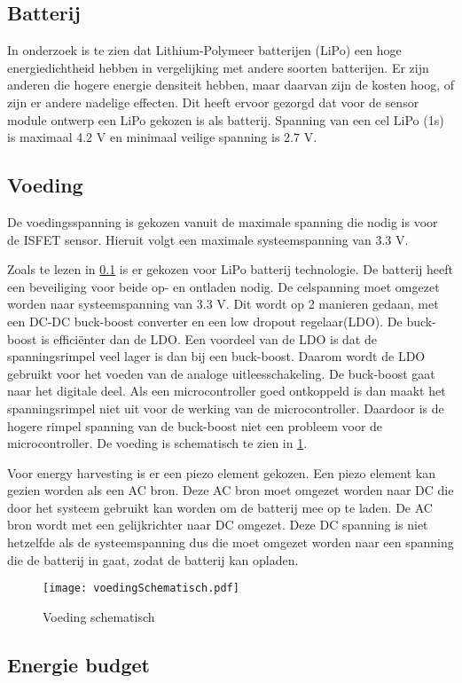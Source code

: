 \subsection{Batterij} \label{sec:battery}
In onderzoek \cite{BatteryComparison} is te zien dat Lithium-Polymeer batterijen (LiPo) een hoge energiedichtheid hebben in vergelijking met andere soorten batterijen. Er zijn anderen die hogere energie densiteit hebben, maar daarvan zijn de kosten hoog, of zijn er andere nadelige effecten\cite{BatteryComparison}. Dit heeft ervoor gezorgd dat voor de sensor module ontwerp een LiPo gekozen is als batterij. Spanning van een cel LiPo (1s) is maximaal 4.2 V en minimaal veilige spanning is 2.7 V\cite{BatteryComparison}.

\subsection{Voeding} \label{sec:voeding} 


De voedingsspanning is gekozen vanuit de maximale spanning die nodig is voor de ISFET sensor\cite{isfet}. Hieruit volgt een maximale systeemspanning van 3.3 V. 


Zoals te lezen in \cref{sec:battery} is er gekozen voor LiPo batterij technologie. De batterij heeft een beveiliging voor beide op- en ontladen nodig. De celspanning moet omgezet worden naar systeemspanning van 3.3 V. Dit wordt op 2 manieren gedaan, met een DC-DC buck-boost converter en een low dropout regelaar(LDO). De buck-boost is efficiënter dan de LDO. Een voordeel van de LDO is dat de spanningsrimpel veel lager is dan bij een buck-boost. Daarom wordt de LDO gebruikt voor het voeden van de analoge uitleesschakeling. De buck-boost gaat naar het digitale deel. Als een microcontroller goed ontkoppeld is dan maakt het spanningsrimpel niet uit voor de werking van de microcontroller. Daardoor is de hogere rimpel spanning van de buck-boost niet een probleem voor de microcontroller. De voeding is schematisch te zien in \cref{fig:voedingSchematisch}.

Voor energy harvesting is er een piezo element gekozen. Een piezo element kan gezien worden als een AC bron. Deze AC bron moet omgezet worden naar DC die door het systeem gebruikt kan worden om de batterij mee op te laden. De AC bron wordt met een gelijkrichter naar DC omgezet. Deze DC spanning is niet hetzelfde als de systeemspanning dus die moet omgezet worden naar een spanning die de batterij in gaat, zodat de batterij kan opladen.

\begin{figure}[ht]
    \centering 
    \texttt{[image: voedingSchematisch.pdf]}
    \caption{Voeding schematisch}
    \label{fig:voedingSchematisch}
\end{figure}





\subsection{Energie budget}
